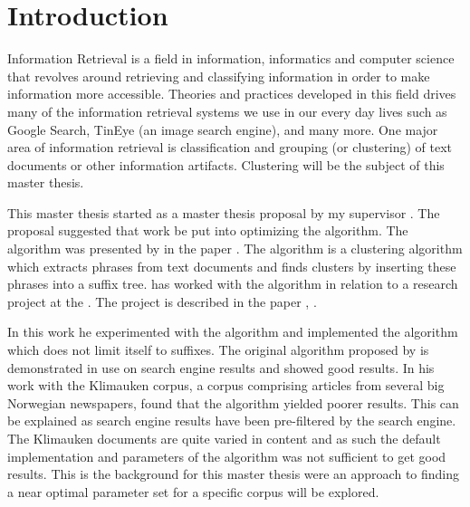 
\chapter{Introduction} %

\label{Introduction}



Information Retrieval is a field in information, informatics and computer science that revolves around retrieving and classifying information in order to make information more accessible. Theories and practices developed in this field drives many of the information retrieval systems we use in our every day lives such as Google Search, TinEye (an image search engine), and many more. One major area of information retrieval is classification and grouping (or clustering) of text documents or other information artifacts. Clustering will be the subject of this master thesis.

This master thesis started as a master thesis proposal by my supervisor \supervisor. The proposal suggested that work be put into optimizing the \STC algorithm. The \STC algorithm was presented by \textcite{Oren1998} in the paper . The algorithm is a clustering algorithm which extracts phrases from text documents and finds clusters by inserting these phrases into a suffix tree. \supervisor has worked with the \STC algorithm in relation to a research project at the \deptname. The project is described in the paper , \cite{Elgesem2009}.

In this work he experimented with the \STC algorithm and implemented the \CTC algorithm which does not limit itself to suffixes. The original \STC algorithm proposed by \textcite{Oren1998} is demonstrated in use on search engine results and showed good results. In his work with the Klimauken corpus, a corpus comprising articles from several big Norwegian newspapers, \supervisor found that the \STC algorithm yielded poorer results. This can be explained as search engine results have been pre-filtered by the search engine. The Klimauken documents are quite varied in content and as such the default implementation and parameters of the \STC algorithm was not sufficient to get good results. This is the background for this master thesis were an approach to finding a near optimal parameter set for a specific corpus will be explored.

